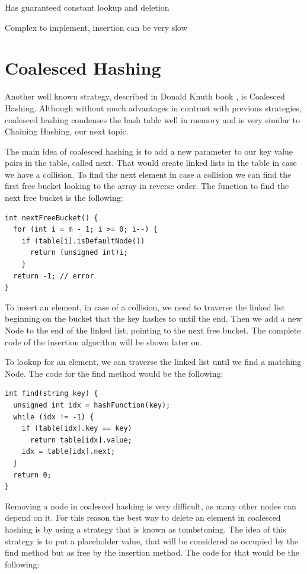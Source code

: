 \rightthumbsup Has guaranteed constant lookup and deletion

\rightthumbsdown Complex to implement, insertion can be very slow

\section{Coalesced Hashing}

Another well known strategy, described in Donald Knuth book \citep{TAOCP3}, is Coalesced Hashing. Although without much advantages in contrast with previous strategies, coalesced hashing condenses the hash table well in memory and is very similar to Chaining Hashing, our next topic.

The main idea of coalesced hashing is to add a new parameter to our key value pairs in the table, called next. That would create linked lists in the table in case we have a collision. To find the next element in case a collision we can find the first free bucket looking to the array in reverse order. The function to find the next free bucket is the following:

\begin{lstlisting}
int nextFreeBucket() {
  for (int i = m - 1; i >= 0; i--) {
    if (table[i].isDefaultNode())
      return (unsigned int)i;
    }
  return -1; // error
}
\end{lstlisting}

To insert an element, in case of a collision, we need to traverse the linked list beginning on the bucket that the key hashes to until the end. Then we add a new Node to the end of the linked list, pointing to the next free bucket. The complete code of the insertion algorithm will be shown later on.

To lookup for an element, we can traverse the linked list until we find a matching Node. The code for the find method would be the following:

\begin{lstlisting}
int find(string key) {
  unsigned int idx = hashFunction(key);
  while (idx != -1) {
    if (table[idx].key == key) 
      return table[idx].value;
    idx = table[idx].next;         
  }    
  return 0;
}
\end{lstlisting}

Removing a node in coalesced hashing is very difficult, as many other nodes can depend on it. For this reason the best way to delete an element in coalesced hashing is by using a strategy that is known as tombstoning. The idea of this strategy is to put a placeholder value, that will be considered as occupied by the find method but as free by the insertion method. The code for that would be the following:

